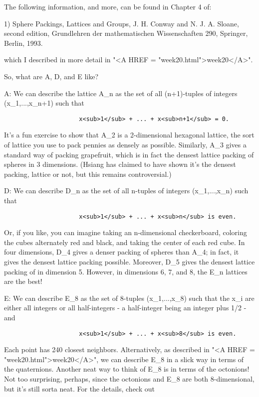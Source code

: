 The following information, and more, can be found in Chapter 4 of:

1) Sphere Packings, Lattices and Groups, J. H. Conway and N. J. A.
Sloane, second edition, Grundlehren der mathematischen Wissenschaften
290, Springer, Berlin, 1993.

which I described in more detail in "<A HREF = "week20.html">week20</A>".  

So, what are A, D, and E like?  

A:  We can describe the lattice A_{n} as the set of all (n+1)-tuples
of integers (x_{1},...,x_{n+1}) such that

\begin{verbatim}
                     x<sub>1</sub> + ... + x<sub>n+1</sub> = 0.
\end{verbatim}
    

It's a fun exercise to show that A_{2} is a 2-dimensional hexagonal
lattice, the sort of lattice you use to pack pennies as densely as
possible.  Similarly, A_{3} gives a standard way of packing grapefruit,
which is in fact the densest lattice packing of spheres in 3 dimensions.
(Hsiang has claimed to have shown it's the densest packing, lattice or not,
but this remains controversial.)

D: We can describe D_{n} as the set of all n-tuples of integers
(x_{1},...,x_{n}) such that 

\begin{verbatim}
                     x<sub>1</sub> + ... + x<sub>n</sub> is even.
\end{verbatim}
    

Or, if you like, you can imagine taking an n-dimensional checkerboard,
coloring the cubes alternately red and black, and taking the center of
each red cube.  In four dimensions, D_{4} gives a denser packing of
spheres than A_{4}; in fact, it gives the densest lattice packing
possible.  Moreover, D_{5} gives the densest lattice packing of in
dimension 5.  However, in dimensions 6, 7, and 8, the E_{n} lattices are
the best! 

E: We can describe E_{8} as the set of 8-tuples (x_{1},...,x_{8}) such
that the x_{i} are either all integers or all half-integers - a
half-integer being an integer plus 1/2 - and 

\begin{verbatim}
                     x<sub>1</sub> + ... + x<sub>8</sub> is even.
\end{verbatim}
    

Each point has 240 closest neighbors.  Alternatively, as described in
"<A HREF = "week20.html">week20</A>", we can describe E_{8} in a slick way in terms of the
quaternions.  Another neat way to think of E_{8} is in terms of the
octonions!  Not too surprising, perhaps, since the octonions and E_{8} are
both 8-dimensional, but it's still sorta neat.  For the details, check
out

